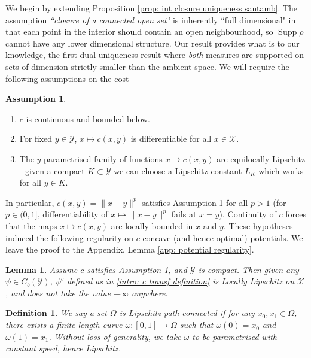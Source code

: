 \documentclass[11pt, oneside, titlepage]{book}
\theoremstyle{plain}
\newtheorem{lemma}[theorem]{Lemma}
\newtheorem{definition}[theorem]{Definition}
\theoremstyle{definition}
\newtheorem{assumption}{Assumption}
\newcommand{\X}{\mathcal{X}}
\newcommand{\Y}{\mathcal{Y}}
\DeclareMathOperator{\supp}{Supp}
\begin{document}
We begin by extending Proposition \ref{prop: int closure uniqueness santamb}. The assumption \textit{``closure of a connected open set"} is inherently ``full dimensional" in that each point in the interior should contain an open neighbourhood, so $\supp \rho$ cannot have any lower dimensional structure. Our result provides what is to our knowledge, the first dual uniqueness result where \textit{both} measures are supported on sets of dimension strictly smaller than the ambient space. We will require the following assumptions on the cost
\begin{assumption}
\hfill
\label{assumption: cost hypotheses}
\begin{enumerate}[label=(\roman*)]
    \item $c$ is continuous and bounded below.
    \item For fixed $y \in \Y$, $x \mapsto c(x, y)$ is differentiable for all $x \in \X$.
    \item The $y$ parametrised family of functions $x \mapsto c(x, y)$ are equilocally Lipschitz - given a compact $K \subset \Y$ we can choose a Lipschitz constant $L_K$ which works for all $y \in K$.
\end{enumerate} 
\end{assumption}
In particular, $c(x, y) = \|x - y\|^p$ satisfies Assumption \ref{assumption: cost hypotheses} for all $p >1$ (for $p \in (0, 1]$, differentiability of $x \mapsto \| x- y\|^p$ fails at $x = y$). Continuity of $c$ forces that the maps $x \mapsto c(x, y)$ are locally bounded in $x$ and $y$. These hypotheses induced the following regularity on $c$-concave (and hence optimal) potentials. We leave the proof to the Appendix, Lemma \ref{app: potential regularity}.
\begin{lemma}
\label{lem: potential regularity}
    Assume $c$ satisfies Assumption \ref{assumption: cost hypotheses}, and $\Y$ is compact. Then given any $\psi \in C_b(\Y)$, $\psi^c$ defined as in \eqref{intro: c transf definition} is Locally Lipschitz on $\X$, and does not take the value $-\infty$ anywhere.
\end{lemma}


\begin{definition}
    We say a set $\Omega$ is Lipschitz-path connected if for any $x_0, x_1 \in \Omega$, there exists a finite length curve $\omega : [0, 1] \to \Omega$ such that $\omega(0)=x_0$ and $\omega(1)=x_1$. Without loss of generality, we take $\omega$ to be parametrised with constant speed, hence Lipschitz.
\end{definition}
\end{document}
